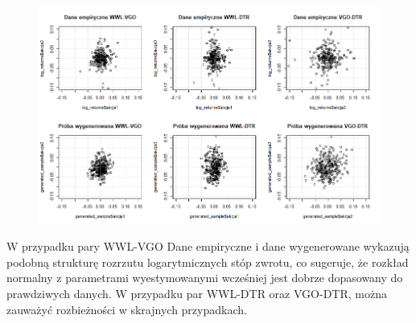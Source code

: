 \documentclass[a4paper,11pt]{article}
\begin{document}
\begin{figure}[H]
    \centering
    \includegraphics[width=1\textwidth]{./img/dane empiryczne-proba wygenerowana pary.png}
\end{figure}

W przypadku pary WWL-VGO Dane empiryczne i dane wygenerowane wykazują podobną strukturę rozrzutu logarytmicznych stóp zwrotu, co sugeruje, że rozkład normalny z parametrami wyestymowanymi wcześniej jest dobrze dopasowany do prawdziwych danych. W przypadku par WWL-DTR oraz VGO-DTR, można zauważyć rozbieżności w skrajnych przypadkach.
\end{document}
